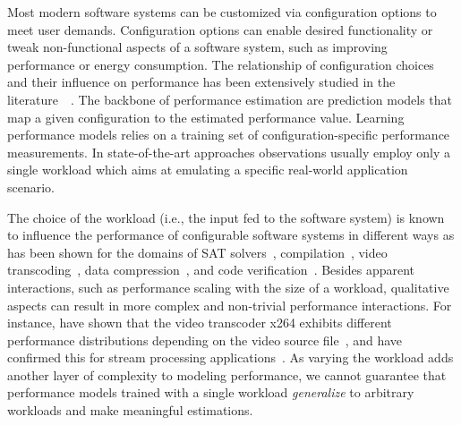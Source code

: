 
Most modern software systems can be customized via configuration options to meet user demands. Configuration options can enable desired functionality or tweak non-functional aspects of a software system, such as improving performance or energy consumption. The relationship of configuration choices and their influence on performance has been extensively studied in the literature~~\cite{dorn2020,siegmundPerformanceinfluenceModelsHighly2015,haDeepPerf2019,perfAL,guoVariabilityawarePerformancePrediction2013,sarkarCostEfficientSamplingPerformance,guo_2018_data,fourier_learning_2015,perLasso}. The backbone of performance estimation are prediction models that map a given configuration to the estimated performance value. Learning performance models relies on a training set of configuration-specific performance measurements. In state-of-the-art approaches observations usually employ only a single workload which aims at emulating a specific real-world application scenario.

The choice of the workload (i.e., the input fed to the software system) is known to influence the performance of configurable software systems in different ways as has been shown for the domains of SAT solvers~\cite{falkner_sat_solvers_2015,satzilla_2008}, compilation~\cite{ding_compilation_2015,plotnikov_compilation_2013}, video transcoding~\cite{maxiaguine_workload_2004,alves_sampling_2020}, data compression~\cite{khavari_compression_2019}, and code verification~\cite{koc_satune_2021}. Besides apparent interactions, such as performance scaling with the size of a workload, qualitative aspects can result in more complex and non-trivial performance interactions. For instance, \citeauthor{alves_sampling_2020} have shown that the video transcoder \textsf{x264} exhibits different performance distributions depending on the video source file~\cite{alves_sampling_2020}, and \citeauthor{liao_2020_using_emse} have confirmed this for stream processing applications~\cite{liao_2020_using_emse}. As varying the workload adds another layer of complexity to modeling performance, we cannot guarantee that performance models trained with a single workload \textit{generalize} to arbitrary workloads and make meaningful estimations. 

